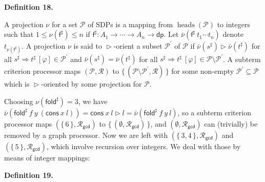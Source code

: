  
 
\par\medskip\noindent\textbf{Definition 18.}\par
 
 
A projection $\nu$ for a set $\mathcal{P}$ of SDPs is a mapping from $\operatorname{heads}(\mathcal{P})$ to integers such that $1\leq\nu(\mathsf{f}^{\sharp})\leq n$ if $\mathsf{f}^{\sharp}:{A}_{1}\rightarrow\cdots\rightarrow{A}_{n}\rightarrow\mathsf{dp}$. Let $\bar{\nu}({\mathsf{f}^{\sharp}}\ {{t}_{1}\cdots{t}_{n}})$ denote $t_{\nu(\mathsf{f}^{\sharp})}$. A projection $\nu$ is said to $\vartriangleright$-orient a subset $\mathcal{P}^{\prime}$ of $\mathcal{P}$ if $\bar{\nu}(s^{\sharp})\vartriangleright\bar{\nu}(t^{\sharp})$ for all ${s^{\sharp}}\Rightarrow{t^{\sharp}}\ [\varphi]\in\mathcal{P}^{\prime}$ and $\bar{\nu}(s^{\sharp})=\bar{\nu}(t^{\sharp})$ for all ${s^{\sharp}}\Rightarrow{t^{\sharp}}\ [\varphi]\in\mathcal{P}\setminus\mathcal{P}^{\prime}$. A subterm criterion processor maps $(\mathcal{P},\mathcal{R})$ to $\{\,(\mathcal{P}\setminus\mathcal{P}^{\prime},\mathcal{R})\,\}$ for some non-empty $\mathcal{P}^{\prime}\subseteq\mathcal{P}$ which is $\vartriangleright$-oriented by some projection for $\mathcal{P}$.\par
 
 
 
 
Choosing $\nu(\mathsf{fold}^{\sharp})=3$, we have $\bar{\nu}({{{\mathsf{fold}^{\sharp}}\ {f}}\ {y}}\ {({{\mathsf{cons}}\ {x}}\ {l})})={{\mathsf{cons}}\ {x}}\ {l}\vartriangleright l=\bar{\nu}({{{\mathsf{fold}^{\sharp}}\ {f}}\ {y}}\ {l})$, so a subterm criterion processor maps $(\{\,\text{6}\,\},\mathcal{R}_{\mathsf{gcd}})$ to $\{\,(\emptyset,\mathcal{R}_{\mathsf{gcd}})\,\}$, and $(\emptyset,\mathcal{R}_{\mathsf{gcd}})$ can (trivially) be removed by a graph processor. Now we are left with $(\{\,\text{3},\text{4}\,\},\mathcal{R}_{\mathsf{gcd}})$ and $(\{\,\text{5}\,\},\mathcal{R}_{\mathsf{gcd}})$, which involve recursion over integers. We deal with those by means of integer mappings:\par
 
 
 
\par\medskip\noindent\textbf{Definition 19.}\par
 
